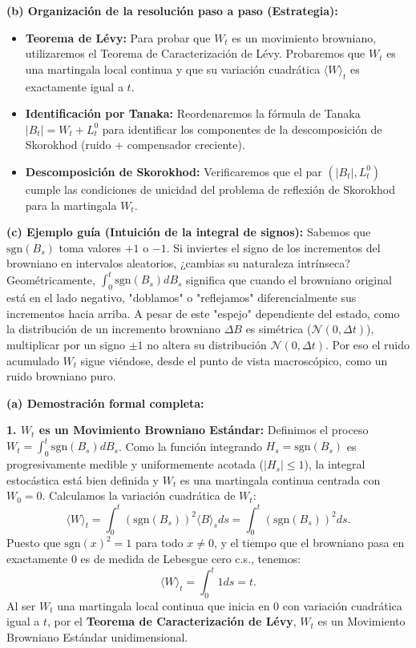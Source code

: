 \documentclass[11pt, letterpaper]{article}
\begin{document}
\vspace{5mm}

\begin{solucion}
    \textbf{(b) Organización de la resolución paso a paso (Estrategia):}
    \begin{itemize}
        \item[(i)] \textbf{Teorema de Lévy:} Para probar que $W_t$ es un movimiento browniano, utilizaremos el Teorema de Caracterización de Lévy. Probaremos que $W_t$ es una martingala local continua y que su variación cuadrática $\langle W \rangle_t$ es exactamente igual a $t$.
        \item[(ii)] \textbf{Identificación por Tanaka:} Reordenaremos la fórmula de Tanaka $|B_t| = W_t + L_t^0$ para identificar los componentes de la descomposición de Skorokhod (ruido + compensador creciente).
        \item[(iii)] \textbf{Descomposición de Skorokhod:} Verificaremos que el par $(|B_t|, L_t^0)$ cumple las condiciones de unicidad del problema de reflexión de Skorokhod para la martingala $W_t$.
    \end{itemize}

    \vspace{3mm}
    \textbf{(c) Ejemplo guía (Intuición de la integral de signos):}
    Sabemos que $\text{sgn}(B_s)$ toma valores $+1$ o $-1$. Si inviertes el signo de los incrementos del browniano en intervalos aleatorios, ¿cambias su naturaleza intrínseca? Geométricamente, $\int_0^t \text{sgn}(B_s)dB_s$ significa que cuando el browniano original está en el lado negativo, "doblamos" o "reflejamos" diferencialmente sus incrementos hacia arriba. A pesar de este "espejo" dependiente del estado, como la distribución de un incremento browniano $\Delta B$ es simétrica ($\mathcal{N}(0, \Delta t)$), multiplicar por un signo $\pm 1$ no altera su distribución $\mathcal{N}(0, \Delta t)$. Por eso el ruido acumulado $W_t$ sigue viéndose, desde el punto de vista macroscópico, como un ruido browniano puro.

    \vspace{3mm}
    \textbf{(a) Demostración formal completa:}

    \textbf{1. $W_t$ es un Movimiento Browniano Estándar:}
    Definimos el proceso $W_t = \int_0^t \text{sgn}(B_s) dB_s$.
    Como la función integrando $H_s = \text{sgn}(B_s)$ es progresivamente medible y uniformemente acotada ($|H_s| \le 1$), la integral estocástica está bien definida y $W_t$ es una martingala continua centrada con $W_0 = 0$.
    Calculamos la variación cuadrática de $W_t$:
    \[ \langle W \rangle_t = \int_0^t (\text{sgn}(B_s))^2 \langle B \rangle_s ds = \int_0^t (\text{sgn}(B_s))^2 ds. \]
    Puesto que $\text{sgn}(x)^2 = 1$ para todo $x \neq 0$, y el tiempo que el browniano pasa en exactamente $0$ es de medida de Lebesgue cero c.s., tenemos:
    \[ \langle W \rangle_t = \int_0^t 1 ds = t. \]
    Al ser $W_t$ una martingala local continua que inicia en 0 con variación cuadrática igual a $t$, por el \textbf{Teorema de Caracterización de Lévy}, $W_t$ es un Movimiento Browniano Estándar unidimensional.


\end{solucion}
\end{document}
